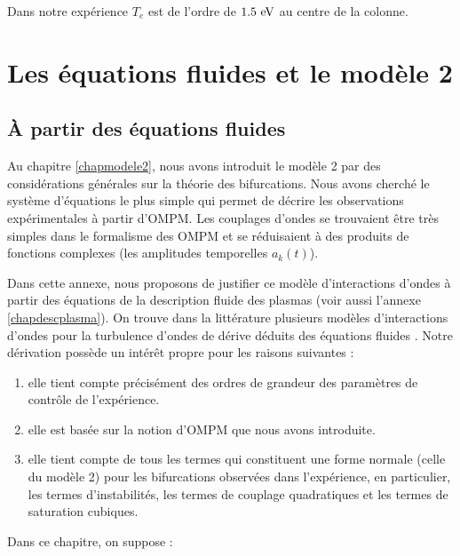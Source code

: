 \documentclass{book}
\begin{document}
Dans notre exp\'erience $T_e$ est de l'ordre de $1.5 \ {\rm eV}$ au centre
de la colonne.


\chapter{Les \'equations fluides et le mod\`ele 2}\label{chapequationsflu}


\section{\`A partir des \'equations fluides}
Au chapitre \ref{chapmodele2}, nous avons introduit le mod\`ele 2 par
des consid\'erations g\'en\'erales sur la th\'eorie des bifurcations.
Nous avons cherch\'e le syst\`eme d'\'equations le plus 
simple qui permet de d\'ecrire les observations exp\'erimentales \`a
partir d'OMPM. Les couplages d'ondes se trouvaient \^etre tr\`es
simples dans le formalisme des OMPM et se r\'eduisaient \`a des produits
de fonctions complexes (les amplitudes temporelles $a_k(t)$).

Dans cette annexe, nous proposons de justifier ce mod\`ele
d'interactions d'ondes \`a partir des \'equations de la description
fluide des plasmas \cite{Braginskii65,Chen84,Delcroix94,Diu89} (voir
aussi l'annexe 
\ref{chapdescplasma}). 
On trouve dans la litt\'erature plusieurs mod\`eles d'interactions
d'ondes pour la turbulence d'ondes de d\'erive
d\'eduits des 
\'equations fluides
\cite{Hasegawa77,Hasegawa78,Hasegawa79,Hasegawa83,Hinton71,Horton84,Horton90}.
Notre d\'erivation poss\`ede un int\'er\^et  propre pour les raisons
suivantes :

\begin{enumerate}
\item elle tient compte pr\'ecis\'ement des ordres de grandeur des
param\`etres de contr\^ole de l'exp\'erience.
\item elle est bas\'ee sur la notion d'OMPM que nous avons introduite.
\item elle tient compte de tous les termes qui constituent une forme
normale (celle du mod\`ele 2)  pour les bifurcations observ\'ees dans
l'exp\'erience, en particulier, les termes d'instabilit\'es, les termes
de couplage quadratiques et les termes de saturation cubiques.
\end{enumerate}

Dans ce chapitre, on suppose :
\end{document}
